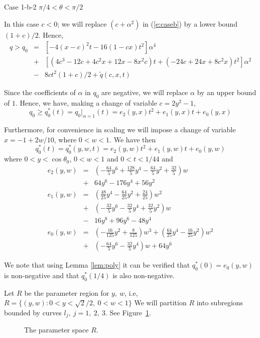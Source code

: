 \documentclass[12pt]{icgft}
\theoremstyle{definition}
\numberwithin{equation}{section}
\begin{document}
\newpage

Case 1-b-2 $\pi/4 < \theta < \pi/2$

\vspace{0.1in}

In this case $c < 0$; we will replace $(c+\alpha^2)$ in (\ref{e:caseb}) by a lower bound $(1+c)/2$.  Hence,
\begin{eqnarray*}
q > q_0 &=& [-4(x-c)^2t - 16(1-cx)t^2]\alpha^4 \\
&+& [(4c^3-12c+4c^2x+12x-8x^2c)t + (-24c + 24x + 8c^2 x)t^2]\alpha^2 \\
&-&8ct^2(1+c)/2 + {\tilde q}(c,x,t)
\end{eqnarray*}

Since the coefficients of $\alpha$ in $q_0$ are negative, we will replace $\alpha$ by an upper bound of $1$.  Hence, we have, making a change of variable $c=2y^2-1$,
$$q_0 \ge q_0^*(t) = {q_0}|_{\alpha=1}(t) = e_2(y,x)t^2 + e_1(y,x)t + e_0(y,x)$$

Furthermore, for convenience in scaling we will impose a change of variable $x= -1 + 2w/10$, where $0 < w < 1$.  We have then
$$q_0^*(t) = q_0^*(y,w,t) = e_2(y,w)t^2 + e_1(y,w)t + e_0(y,w)$$
\noindent where $0 < y < \cos \theta_0$, $0 < w < 1$ and $0 < t < 1/44$ and
\begin{eqnarray*}
e_2(y,w) &=& (-\frac{64}{5}y^6 +\frac{128}{5}y^4 -\frac{64}{5}y^2 +\frac{32}{5})w \\
 &+& 64y^6 -176y^4 +56y^2 \\
e_1(y,w) &=& (\frac{48}{25}y^4 -\frac{64}{25}y^2 + \frac{24}{25})w^2 \\
 &+& (-\frac{32}{5}y^6 -\frac{32}{5}y^4 + \frac{32}{5}y^2)w \\
 &-&16y^8 +96y^6 -48y^4 \\
e_0(y,w) &=& (-\frac{16}{125}y^2 + \frac{8}{125})w^3 + (\frac{64}{25}y^4 - \frac{16}{25}y^2)w^2 \\
  &+& (-\frac{64}{5}y^6 - \frac{32}{5}y^4)w + 64y^6
\end{eqnarray*}

We note that using Lemma \ref{lem:poly} it can be verified that $q_0^*(0) = e_0(y,w)$ is non-negative and that $q_0^*(1/4)$ is also non-negative.

Let $R$ be the parameter region for $y,\ w$, i.e, $R = \{ (y,w) : 0 < y < \sqrt{2}/2 , \ 0 < w < 1 \}$   We will partition $R$ into subregions bounded by curves $l_j, \  j = 1,\ 2,\ 3$.
See Figure~\ref{F:pspace1}.

\begin{figure}
\begin{center}
\caption{The parameter space $R$.}
\label{F:pspace1}
\end{center}
\end{figure}
\end{document}
